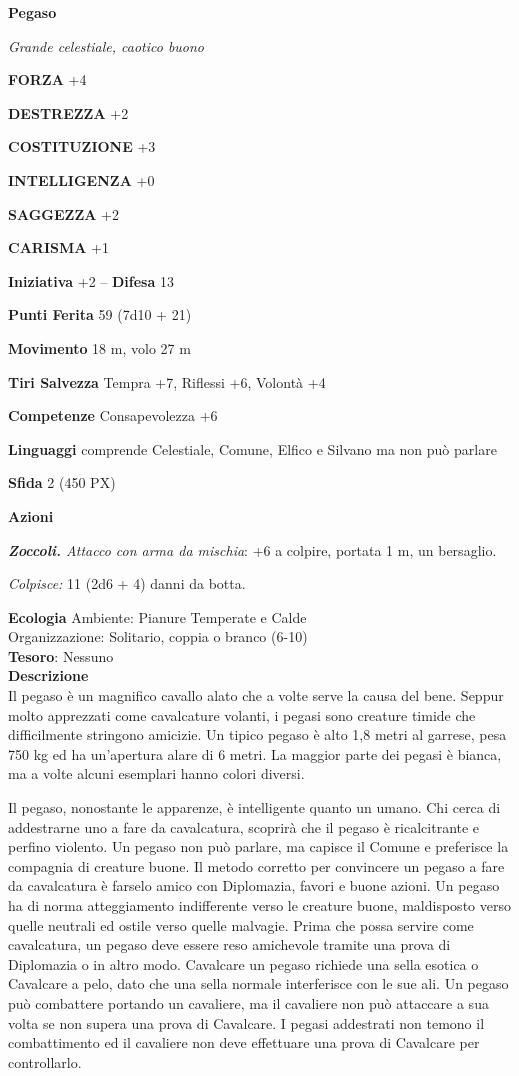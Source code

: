 \begin{multicols}{2}
\medskip{}\textbf{Pegaso}

\textit{Grande celestiale, caotico buono}

\textbf{FORZA} +4

\textbf{DESTREZZA} +2

\textbf{COSTITUZIONE} +3

\textbf{INTELLIGENZA} +0

\textbf{SAGGEZZA} +2

\textbf{CARISMA} +1

\textbf{Iniziativa} +2 -- \textbf{Difesa} 13

\textbf{Punti Ferita} 59 (7d10 + 21)

\textbf{Movimento} 18 m, volo 27 m

\textbf{Tiri Salvezza} Tempra +7, Riflessi +6, Volontà +4

\textbf{Competenze} Consapevolezza +6

\textbf{Linguaggi} comprende Celestiale, Comune, Elfico e Silvano ma non può parlare

\textbf{Sfida} 2 (450 PX)

\textbf{Azioni}

\textit{\textbf{Zoccoli.} Attacco con arma da mischia}: +6 a colpire, portata 1 m, un bersaglio.

\textit{Colpisce:} 11 (2d6 + 4) danni da botta.

\textbf{Ecologia}
Ambiente: Pianure Temperate e Calde\\
Organizzazione: Solitario, coppia o branco (6-10)\\
\textbf{Tesoro}: Nessuno\\
\textbf{Descrizione}\\
Il pegaso è un magnifico cavallo alato che a volte serve la causa del bene. Seppur molto apprezzati come cavalcature volanti, i pegasi sono creature timide che difficilmente stringono amicizie. Un tipico pegaso è alto 1,8 metri al garrese, pesa 750 kg ed ha un'apertura alare di 6 metri. La maggior parte dei pegasi è bianca, ma a volte alcuni esemplari hanno colori diversi.

Il pegaso, nonostante le apparenze, è intelligente quanto un umano. Chi cerca di addestrarne uno a fare da cavalcatura, scoprirà che il pegaso è ricalcitrante e perfino violento. Un pegaso non può parlare, ma capisce il Comune e preferisce la compagnia di creature buone. Il metodo corretto per convincere un pegaso a fare da cavalcatura è farselo amico con Diplomazia, favori e buone azioni. Un pegaso ha di norma atteggiamento indifferente verso le creature buone, maldisposto verso quelle neutrali ed ostile verso quelle malvagie. Prima che possa servire come cavalcatura, un pegaso deve essere reso amichevole tramite una prova di Diplomazia o in altro modo. Cavalcare un pegaso richiede una sella esotica o Cavalcare a pelo, dato che una sella normale interferisce con le sue ali. Un pegaso può combattere portando un cavaliere, ma il cavaliere non può attaccare a sua volta se non supera una prova di Cavalcare. I pegasi addestrati non temono il combattimento ed il cavaliere non deve effettuare una prova di Cavalcare per controllarlo.


\end{multicols}
